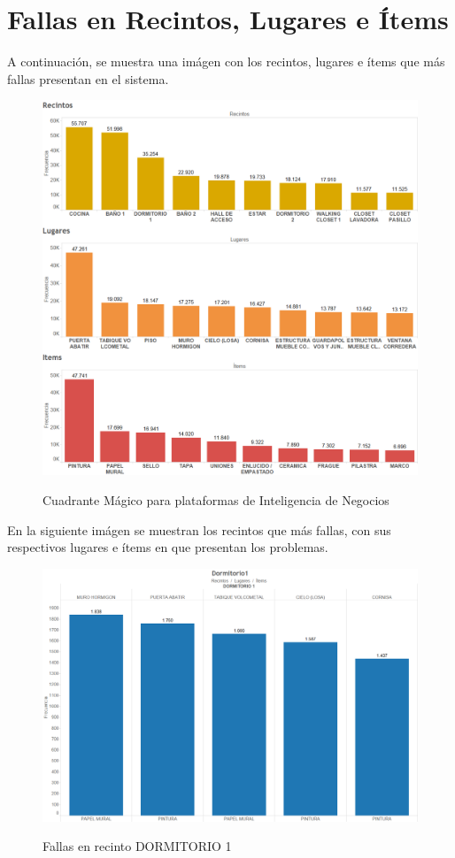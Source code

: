 \documentclass[letter,12pt,oneside]{report}
\begin{document}
\section{Fallas en Recintos, Lugares e Ítems}
A continuación, se muestra una imágen con los recintos, lugares e ítems que más fallas presentan en el sistema.
\begin{figure}[H]
\begin{center}
\includegraphics[scale=0.7]{images/Dashboard1.png}
\caption{Cuadrante Mágico para plataformas de Inteligencia de Negocios}
\label{}
\end{center}
\end{figure}

En la siguiente imágen se muestran los recintos que más fallas, con sus respectivos lugares e ítems en que presentan los problemas.

\begin{figure}[H]
\begin{center}
\includegraphics[scale=0.5]{images/Dormitorio1.png}
\caption{Fallas en recinto DORMITORIO 1}
\label{}
\end{center}
\end{figure}
\end{document}
